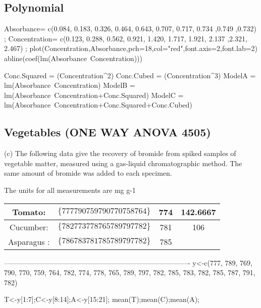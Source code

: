 \subsection*{Polynomial}

Absorbance= c(0.084, 0.183, 0.326, 0.464, 0.643, 0.707, 0.717, 0.734 ,0.749 ,0.732) ;
Concentration= c(0.123, 0.288, 0.562, 0.921, 1.420, 1.717, 1.921, 2.137 ,2.321, 2.467) ;
plot(Concentration,Absorbance,pch=18,col="red",font.axis=2,font.lab=2)
abline(coef(lm(Absorbance~Concentration)))

Conc.Squared = (Concentration^2)
Conc.Cubed = (Concentration^3)
ModelA = lm(Absorbance~Concentration)
ModelB = lm(Absorbance~Concentration+Conc.Squared)
ModelC = lm(Absorbance~Concentration+Conc.Squared+Conc.Cubed)

\subsection{Vegetables (ONE WAY ANOVA 4505)}

(c) The following data give the recovery of bromide from spiked samples of vegetable matter, measured using a gas-liquid chromatographic method. The same amount of bromide was added to each specimen. 

The units for all measurements are  mg g-1

\begin{center}
\begin{tabular}{|c|c|c|c|}
Tomato: & $\{777 790 759 790 770 758 764\}$ & 774 & 142.6667
 \\ \hline

Cucumber: & $\{782 773 778 765 789 797 782\}$ & 781 &  106\\ \hline

Asparagus : & $\{786 783 781 785 789 797 782 \}$& 785 & \\ \hline
\end{tabular} 
\end{center}


-------------------------------------------------------------------------------
y<-c(777, 789, 769, 790, 770, 759, 764, 782, 774, 778, 765, 789, 
797, 782, 785, 783, 782, 785, 787, 791, 782)



T<-y[1:7];C<-y[8:14];A<-y[15:21];
mean(T);mean(C);mean(A);

